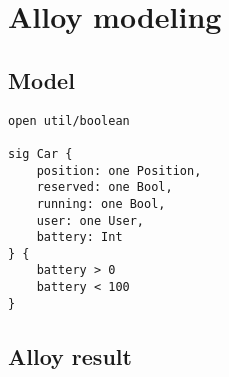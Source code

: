 \chapter{Alloy modeling}

\section{Model}
\begin{verbatim}
open util/boolean

sig Car {
	position: one Position,
	reserved: one Bool,
	running: one Bool,
	user: one User,
	battery: Int
} {
	battery > 0
	battery < 100
}
\end{verbatim}

\section{Alloy result}
